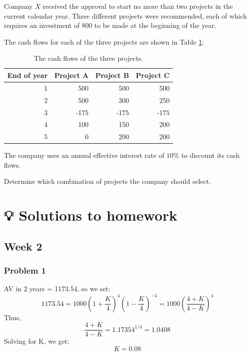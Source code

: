 \documentclass[
]{book}
\begin{document}
Company \(X\) received the approval to start no more than two projects in the current calendar year.
Three different projects were recommended, each of which requires an investment of 800 to be made at the beginning of the year.

The cash flows for each of the three projects are shown in Table \ref{tab:week1}:

\begin{table}[!h]

\caption{\label{tab:week1}The cash flows of the three projects.}
\centering
\begin{tabular}[t]{r|r|r|r}
\hline
End of year & Project A & Project B & Project C\\
\hline
1 & 500 & 500 & 500\\
\hline
2 & 500 & 300 & 250\\
\hline
3 & -175 & -175 & -175\\
\hline
4 & 100 & 150 & 200\\
\hline
5 & 0 & 200 & 200\\
\hline
\end{tabular}
\end{table}

The company uses an annual effective interest rate of \(10\%\) to discount its cash flows.

Determine which combination of projects the company should select.

\hypertarget{solutions-to-homework}{%
\chapter*{💡 Solutions to homework}\label{solutions-to-homework}}

\hypertarget{week-2}{%
\section*{Week 2}\label{week-2}}

\hypertarget{problem-1}{%
\subsection*{Problem 1}\label{problem-1}}

AV in 2 years = 1173.54, so we set:
\[1173.54=1000\left(1+\frac{K}{4}\right)^{4}\left(1-\frac{K}{4}\right)^{-4}=1000\left(\frac{4+K}{4-K}\right)^{4}\]
Thus,
\[\frac{4+K}{4-K}=1.17354^{1/4}=1.0408\]
Solving for K, we get:
\[K=0.08\]
\end{document}

